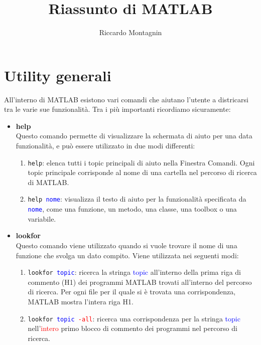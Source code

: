 \documentclass[12pt,a4paper,oneside]{book}
\begin{document}
\title{Riassunto di MATLAB}
\author{Riccardo Montagnin}
\date{}

\maketitle

\tableofcontents

\chapter{Utility generali}
All'interno di MATLAB esistono vari comandi che aiutano l'utente a districarsi tra le varie sue funzionalità.
Tra i più importanti ricordiamo sicuramente:

\begin{itemize}
	
	\item 	\textbf{help} \\ 
		  	Questo comando permette di visualizzare la schermata di aiuto per una data funzionalità, e può essere 
		  	utilizzato in due modi differenti:
		  	\begin{enumerate}
		  	
				\item	\texttt{help}: elenca tutti i topic principali di aiuto nella Finestra Comandi. Ogni topic
						principale corrisponde al nome di una cartella nel percorso di ricerca di MATLAB.
						
				\item	\texttt{help \textcolor{blue}{nome}}: visualizza il testo di aiuto per la funzionalità 
						specificata da \texttt{\textcolor{blue}{nome}}, come una funzione, un metodo, una classe, 
						una toolbox o una variabile.
		  	
		  	\end{enumerate}
		  	
	\item	\textbf{lookfor} \\
			Questo comando viene utilizzato quando si vuole trovare il nome di una funzione che svolga un dato
			compito. Viene utilizzata nei seguenti modi:
			\begin{enumerate}
			
				\item 	\texttt{lookfor \textcolor{blue}{topic}}: ricerca la stringa \textcolor{blue}{topic}
						all'interno della prima riga di commento (H1) dei programmi MATLAB trovati all'interno del
						percorso di ricerca. Per ogni file per il quale si è trovata una corrispondenza, MATLAB
						mostra l'intera riga H1.
						
				\item 	\texttt{lookfor \textcolor{blue}{topic} \textcolor{red}{-all}}: ricerca una corrispondenza 
						per la stringa \textcolor{blue}{topic} nell'\textcolor{red}{intero} primo blocco di 
						commento dei programmi nel percorso di ricerca.
			
			\end{enumerate}
	
\end{itemize}
\end{document}
